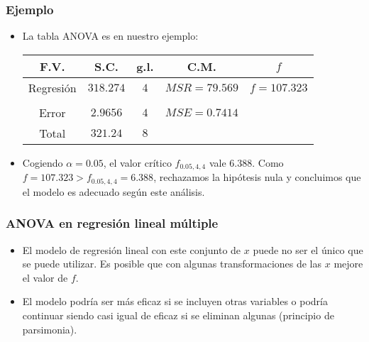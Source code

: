 \begin{frame}
\frametitle{Ejemplo}
\begin{itemize}
\item<2->{La tabla ANOVA es en nuestro ejemplo:
\begin{center}\begin{tabular}{|c|c|c|c|c|}\hline
F.V. & S.C. & g.l. & C.M. & $f$\\\hline
Regresión & $318.274$ & $4$ & $MSR=79.569$ & $f=107.323$ \\ &&&&\\
Error & $2.9656$ & $4$& $MSE=0.7414$ & \\
\hline Total & $321.24$ & $8$ & & \\\hline\end{tabular}\end{center}}
\item<3->{Cogiendo $\alpha =0.05$, el valor crítico $f_{0.05,4,4}$ vale $6.388.$ Como $f=107.323 > f_{0.05,4,4}=6.388$, rechazamos la hipótesis nula y concluimos que el modelo es adecuado según este análisis.}
\end{itemize}
\end{frame}
\begin{frame}
\frametitle{ANOVA en regresión lineal múltiple}
\begin{itemize}
\item<2->{El modelo de regresión lineal con este conjunto de $x$
puede no ser el único que se puede utilizar. Es posible que con
algunas transformaciones de las $x$ mejore el valor de $f$.}
\item<3->{El modelo podría ser más eficaz si se incluyen otras variables o
podría continuar siendo casi igual de eficaz si se eliminan
algunas (principio de parsimonia).}
\end{itemize}
\end{frame}
